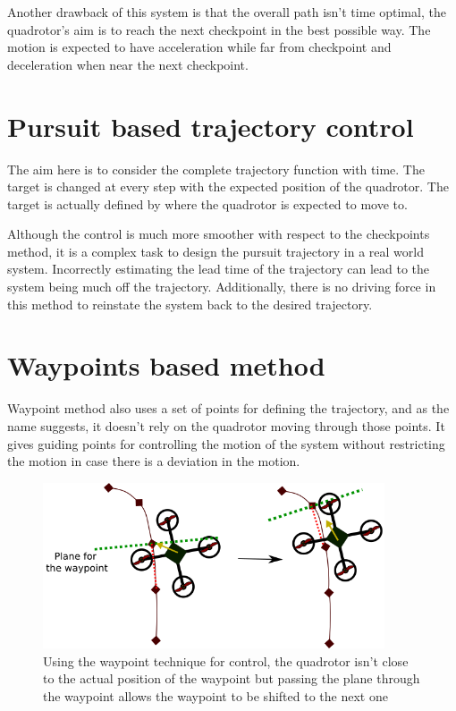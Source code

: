 \documentclass[hidelinks,BTech]{iitmdiss}
\begin{document}
Another drawback of this system is that the overall path isn't time optimal, the quadrotor's aim is to reach the next checkpoint in the best possible way. The motion is expected to have acceleration while far from checkpoint and deceleration when near the next checkpoint.


\section{Pursuit based trajectory control}

The aim here is to consider the complete trajectory function with time. The target is changed at every step with the expected position of the quadrotor. The target is actually defined by where the quadrotor is expected to move to.

Although the control is much more smoother with respect to the checkpoints method, it is a complex task to design the pursuit trajectory in a real world system. Incorrectly estimating the lead time of the trajectory can lead to the system being much off the trajectory. Additionally, there is no driving force in this method to reinstate the system back to the desired trajectory.

\section{Waypoints based method}
Waypoint method also uses a set of points for defining the trajectory, and as the name suggests, it doesn't rely on the quadrotor moving through those points. It gives guiding points for controlling the motion of the system without restricting the motion in case there is a deviation in the motion. 

\begin{figure}[H]
  \centering
    \includegraphics[width=0.9\textwidth]{Waypoints_trajectory.png}
    \caption{Using the waypoint technique for control, the quadrotor isn't close to the actual position of the waypoint but passing the plane through the waypoint allows the waypoint to be shifted to the next one}
\end{figure}
\end{document}

